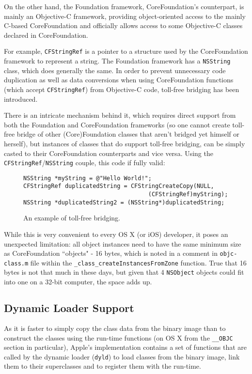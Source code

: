 On the other hand, the Foundation framework, CoreFoundation's counterpart, is mainly an Objective-C framework, providing object-oriented access to the mainly C-based CoreFoundation and officially allows access to some Objective-C classes declared in CoreFoundation.

For example, \verb=CFStringRef= is a pointer to a structure used by the CoreFoundation framework to represent a string. The Foundation framework has a \verb=NSString= class, which does generally the same. In order to prevent unnecessary code duplication as well as data conversions when using CoreFoundation functions (which accept \verb=CFStringRef=) from Objective-C code, toll-free bridging has been introduced.

There is an intricate mechanism behind it, which requires direct support from both the Foundation and CoreFoundation frameworks (so one cannot create toll-free bridge of other (Core)Foundation classes that aren't bridged yet himself or herself)\cite{toll_free_bridging_internals}, but instances of classes that do support toll-free bridging, can be simply casted to their CoreFoundation counterparts and vice versa. Using the \verb=CFStringRef=/\verb=NSString= couple, this code if fully valid:

\begin{figure}[H]
\begin{verbatim}
NSString *myString = @"Hello World!";
CFStringRef duplicatedString = CFStringCreateCopy(NULL, 
                                    (CFStringRef)myString);
NSString *duplicatedString2 = (NSString*)duplicatedString;
\end{verbatim}
  \centering{}
  \caption{An example of toll-free bridging.}
  \label{fig:toll_free_bridging}
\end{figure}

While this is very convenient to every OS X (or iOS) developer, it poses an unexpected limitation: all object instances need to have the same minimum size as CoreFoundation ``objects" - 16 bytes, which is noted in a comment in \verb=objc-class.m= file within the \verb=_class_createInstancesFromZone= function. True that 16 bytes is not that much in these days, but given that 4 \verb=NSObject= objects could fit into one on a 32-bit computer, the space adds up.

\subsection{Dynamic Loader Support}
As it is faster to simply copy the class data from the binary image than to construct the classes using the run-time functions (on OS X from the \verb=__OBJC= section in particular), Apple's implementation contains a set of functions that are called by the dynamic loader (\verb=dyld=) to load classes from the binary image, link them to their superclasses and to register them with the run-time.

